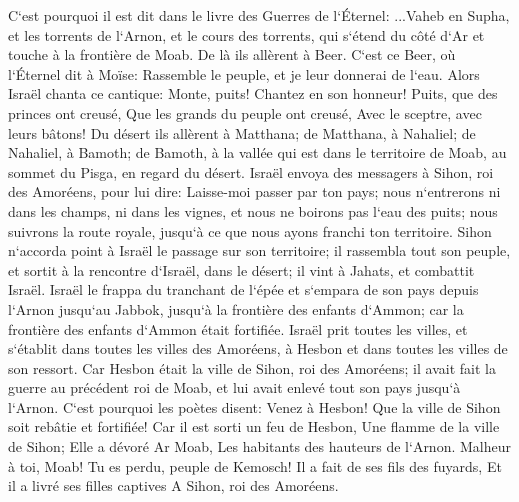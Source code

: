 \verse C`est pourquoi il est dit dans le livre des Guerres de l`Éternel: ...Vaheb en Supha, et les torrents de l`Arnon, 
\verse et le cours des torrents, qui s`étend du côté d`Ar et touche à la frontière de Moab. 
\verse De là ils allèrent à Beer. C`est ce Beer, où l`Éternel dit à Moïse: Rassemble le peuple, et je leur donnerai de l`eau. 
\verse Alors Israël chanta ce cantique: Monte, puits! Chantez en son honneur! 
\verse Puits, que des princes ont creusé, Que les grands du peuple ont creusé, Avec le sceptre, avec leurs bâtons! 
\verse Du désert ils allèrent à Matthana; de Matthana, à Nahaliel; de Nahaliel, à Bamoth; 
\verse de Bamoth, à la vallée qui est dans le territoire de Moab, au sommet du Pisga, en regard du désert. 
\verse Israël envoya des messagers à Sihon, roi des Amoréens, pour lui dire: 
\verse Laisse-moi passer par ton pays; nous n`entrerons ni dans les champs, ni dans les vignes, et nous ne boirons pas l`eau des puits; nous suivrons la route royale, jusqu`à ce que nous ayons franchi ton territoire. 
\verse Sihon n`accorda point à Israël le passage sur son territoire; il rassembla tout son peuple, et sortit à la rencontre d`Israël, dans le désert; il vint à Jahats, et combattit Israël. 
\verse Israël le frappa du tranchant de l`épée et s`empara de son pays depuis l`Arnon jusqu`au Jabbok, jusqu`à la frontière des enfants d`Ammon; car la frontière des enfants d`Ammon était fortifiée. 
\verse Israël prit toutes les villes, et s`établit dans toutes les villes des Amoréens, à Hesbon et dans toutes les villes de son ressort. 
\verse Car Hesbon était la ville de Sihon, roi des Amoréens; il avait fait la guerre au précédent roi de Moab, et lui avait enlevé tout son pays jusqu`à l`Arnon. 
\verse C`est pourquoi les poètes disent: Venez à Hesbon! Que la ville de Sihon soit rebâtie et fortifiée! 
\verse Car il est sorti un feu de Hesbon, Une flamme de la ville de Sihon; Elle a dévoré Ar Moab, Les habitants des hauteurs de l`Arnon. 
\verse Malheur à toi, Moab! Tu es perdu, peuple de Kemosch! Il a fait de ses fils des fuyards, Et il a livré ses filles captives A Sihon, roi des Amoréens. 

